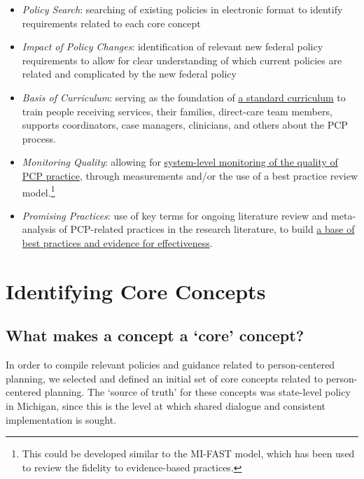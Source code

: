 \documentclass[
]{book}
\providecommand{\tightlist}{%
  \setlength{\itemsep}{0pt}\setlength{\parskip}{0pt}}
\begin{document}
\begin{itemize}
\tightlist
\item
  \emph{Policy Search}: searching of existing policies in electronic format to identify requirements related to each core concept
\item
  \emph{Impact of Policy Changes}: identification of relevant new federal policy requirements to allow for clear understanding of which current policies are related and complicated by the new federal policy
\item
  \emph{Basis of Curriculum}: serving as the foundation of \protect\hyperlink{curriculum}{a standard curriculum} to train people receiving services, their families, direct-care team members, supports coordinators, case managers, clinicians, and others about the PCP process.
\item
  \emph{Monitoring Quality}: allowing for \protect\hyperlink{measure}{system-level monitoring of the quality of PCP practice}, through measurements and/or the use of a best practice review model.\footnote{This could be developed similar to the MI-FAST model, which has been used to review the fidelity to evidence-based practices.}
\item
  \emph{Promising Practices}: use of key terms for ongoing literature review and meta-analysis of PCP-related practices in the research literature, to build \protect\hyperlink{research}{a base of best practices and evidence for effectiveness}.
\end{itemize}

\hypertarget{identifying-core-concepts}{%
\section{Identifying Core Concepts}\label{identifying-core-concepts}}

\hypertarget{what-makes-a-concept-a-core-concept}{%
\subsection{What makes a concept a `core' concept?}\label{what-makes-a-concept-a-core-concept}}

In order to compile relevant policies and guidance related to person-centered planning, we selected and defined an initial set of core concepts related to person-centered planning. The `source of truth' for these concepts was state-level policy in Michigan, since this is the level at which shared dialogue and consistent implementation is sought.
\end{document}
